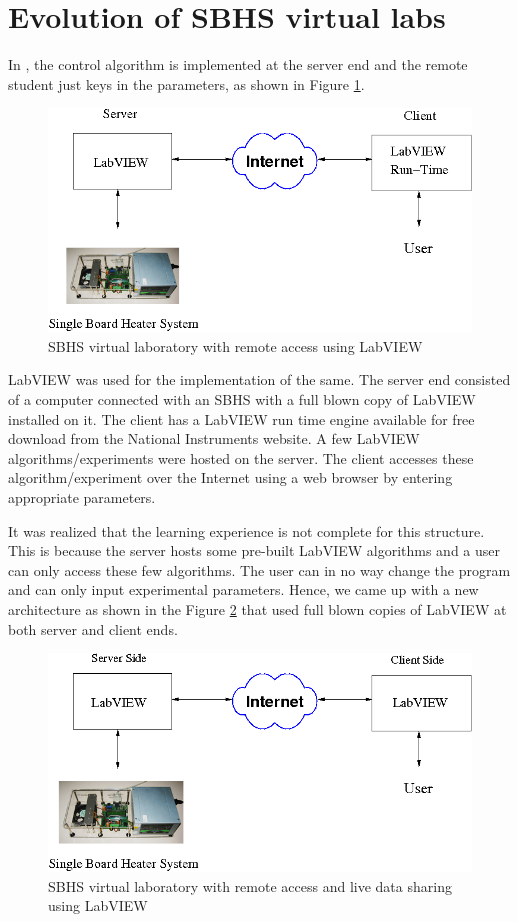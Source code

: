 \section{Evolution of SBHS virtual labs}
In \cite{vlabs-kmm}, 
the control algorithm is implemented at the server end and the remote
student just keys in the parameters, as shown in Figure
\ref{fig:initial}. 
\begin{figure}
\includegraphics[width=\linewidth]{IEEE-Chile/figures/vlab-1.png}
\caption{SBHS virtual laboratory with remote access using LabVIEW}
\label{fig:initial}
\end{figure}
LabVIEW was used for the implementation of the same. The
server end consisted of a computer connected with an SBHS with a full
blown copy of LabVIEW installed on it. The client has a LabVIEW run
time engine available for free download from the National Instruments
website.  A few
LabVIEW algorithms/experiments were hosted on the server. The client
accesses these algorithm/experiment over the Internet using a web
browser by entering appropriate parameters.

It was realized that the learning experience is not complete for this
structure. This is because the server hosts some pre-built LabVIEW
algorithms and a user can only access these few algorithms. The user
can in no way change the program and can only input experimental
parameters. 
Hence, we came up with a new architecture
as shown in the Figure \ref{fig:second} that used full blown copies of
LabVIEW at both server and client ends.  
\begin{figure}
\includegraphics[width=\linewidth]{IEEE-Chile/figures/vlab-2.png}
\caption{SBHS virtual laboratory with remote access and live data sharing using LabVIEW}
\label{fig:second}
\end{figure}
 
